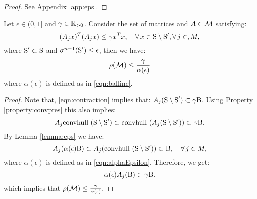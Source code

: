 \begin{proof}See Appendix \ref{app:eps}.
\end{proof}

\begin{lemma}\label{lemma:epsilon1}Let $\epsilon \in (0, 1]$ and $\gamma \in \mathbb{R}_{> 0}$. Consider the set of matrices and $A \in \mathcal{M}$ satisfying:
\begin{equation}\label{eqn:contraction}(A_jx)^T(A_jx) \leq \gamma x^Tx, \quad \forall\, x \in \text{S} \setminus \text{S}', \forall\,j \in, M,\end{equation}
where $\text{S}' \subset \text{S}$ and $\sigma^{n-1}(\text{S}') \leq \epsilon$, then we have:
\begin{equation*}
\rho(\mathcal{M}) \leq \frac{\gamma}{\alpha(\epsilon)}
\end{equation*}
where $\alpha(\epsilon)$ is defined as in \eqref{eqn:ballinc}.
\end{lemma}

\begin{proof}Note that, \eqref{eqn:contraction} implies that:
$A_j (\text{S} \setminus \text{S}') \subset \gamma \text{B}.$
Using Property \ref{property:convpres} this also implies:
$$A_j \mbox{convhull }(\text{S} \setminus \text{S}') \subset \mbox{convhull }(A_j(\text{S} \setminus \text{S}')) \subset \gamma \text{B} .$$
By Lemma \ref{lemma:eps} we have:
$$A_j (\alpha(\epsilon) \text{B}) \subset A_j (\mbox{convhull } (\text{S} \setminus \text{S}')) \subset \text{B}, \quad  \forall\, j \in M,$$
where $\alpha(\epsilon)$ is defined as in \eqref{eqn:alphaEpsilon}. Therefore, we get:
$$\alpha(\epsilon) A_j (\text{B}) \subset \gamma\text{B}.$$
which implies that $\rho(\mathcal{M}) \leq \frac{\gamma}{\alpha(\epsilon)}.$
\end{proof}





